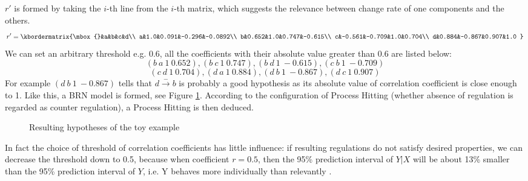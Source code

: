  $r'$ is formed by taking the $i$-th line from the $i$-th matrix, which suggests the relevance between change rate of one components and the others.
$$r'=\kbordermatrix{\mbox{}&a&b&c&d\\
a&1.0&0.091&-0.296&-0.0892\\
b&0.652&1.0&0.747&-0.615\\
c&-0.561&-0.709&1.0&0.704\\
d&0.884&-0.867&0.907&1.0
}$$
We can set an arbitrary threshold e.g. 0.6, all the coefficients with their absolute value greater than 0.6 are listed below:
$$(b\ a\ 1\ 0.652),(b\ c\ 1\ 0.747),(b\ d\ 1\ -0.615),(c\ b\ 1\ -0.709)$$
$$(c\ d\ 1\ 0.704),(d\ a\ 1\ 0.884),(d\ b\ 1\ -0.867),(d\ c\ 1\ 0.907)$$
For example $(d\ b\ 1\ -0.867)$ tells that $d\xrightarrow{-}b$ is probably a good hypothesis as its absolute value of correlation coefficient is close enough to 1. Like this, a BRN model is formed, see Figure \ref{ResultBRN}. According to the configuration of Process Hitting (whether absence of regulation is regarded as counter regulation), a Process Hitting is then deduced.\par
\begin{figure}[ht]
\centering
{}
\caption{Resulting hypotheses of the toy example}\label{ResultBRN}
\end{figure}
In fact the choice of threshold of correlation coefficients has little influence: if resulting regulations do not satisfy desired properties, we can decrease the threshold down to 0.5, because when coefficient $r =0.5$, then the 95\% prediction interval of $Y|X$ will be about 13\% smaller than the 95\% prediction interval of $Y$, i.e. Y behaves more individually than relevantly \cite{hull1927correlation}.

